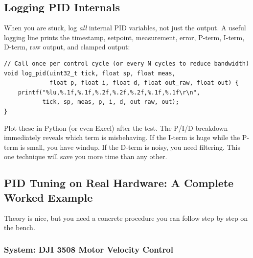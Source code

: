 \subsection{Logging PID Internals}

When you are stuck, log \textit{all} internal PID variables, not just the output. A useful logging line prints the timestamp, setpoint, measurement, error, P-term, I-term, D-term, raw output, and clamped output:

\begin{verbatim}
// Call once per control cycle (or every N cycles to reduce bandwidth)
void log_pid(uint32_t tick, float sp, float meas,
             float p, float i, float d, float out_raw, float out) {
    printf("%lu,%.1f,%.1f,%.2f,%.2f,%.2f,%.1f,%.1f\r\n",
           tick, sp, meas, p, i, d, out_raw, out);
}
\end{verbatim}

Plot these in Python (or even Excel) after the test. The P/I/D breakdown immediately reveals which term is misbehaving. If the I-term is huge while the P-term is small, you have windup. If the D-term is noisy, you need filtering. This one technique will save you more time than any other.

\subsection{PID Tuning on Real Hardware: A Complete Worked Example}

Theory is nice, but you need a concrete procedure you can follow step by step on the bench.

\subsubsection{System: DJI 3508 Motor Velocity Control}

